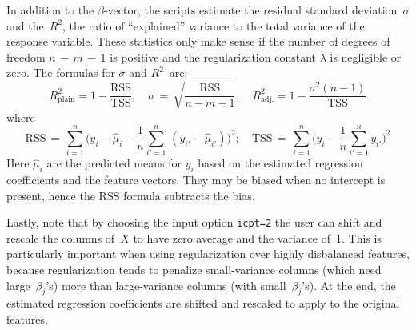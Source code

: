 In addition to the $\beta$-vector, the scripts estimate the residual standard
deviation~$\sigma$ and the~$R^2$, the ratio of ``explained'' variance to the total
variance of the response variable.  These statistics only make sense if the number
of degrees of freedom $n\,{-}\,m\,{-}\,1$ is positive and the regularization constant
$\lambda$ is negligible or zero.  The formulas for $\sigma$ and $R^2$~are:
\begin{equation*}
R^2_{\textrm{plain}} = 1 - \frac{\mathrm{RSS}}{\mathrm{TSS}},\quad
\sigma \,=\, \sqrt{\frac{\mathrm{RSS}}{n - m - 1}},\quad
R^2_{\textrm{adj.}} = 1 - \frac{\sigma^2 (n-1)}{\mathrm{TSS}}
\end{equation*}
where
\begin{equation*}
\mathrm{RSS} \,=\, \sum_{i=1}^n \Big(y_i - \hat{\mu}_i - 
\frac{1}{n} \sum_{i'=1}^n \,(y_{i'} - \hat{\mu}_{i'})\Big)^2; \quad
\mathrm{TSS} \,=\, \sum_{i=1}^n \Big(y_i - \frac{1}{n} \sum_{i'=1}^n y_{i'}\Big)^2
\end{equation*}
Here $\hat{\mu}_i$ are the predicted means for $y_i$ based on the estimated
regression coefficients and the feature vectors.  They may be biased when no
intercept is present, hence the RSS formula subtracts the bias.

Lastly, note that by choosing the input option {\tt icpt=2} the user can shift
and rescale the columns of~$X$ to have zero average and the variance of~1.
This is particularly important when using regularization over highly disbalanced
features, because regularization tends to penalize small-variance columns (which
need large~$\beta_j$'s) more than large-variance columns (with small~$\beta_j$'s).
At the end, the estimated regression coefficients are shifted and rescaled to
apply to the original features.

\smallskip
{}
\smallskip

